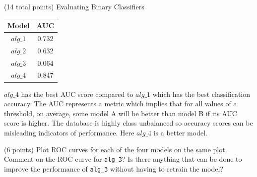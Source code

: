 \documentclass[12pt]{article}
\begin{document}
\begin{question}{(14 total points) Evaluating Binary Classifiers}
\begin{subquestion}
\begin{answerbox}{15em}
\begin{center}
    \begin{tabular}{|c|c|}
    \hline
    Model & AUC \\ \hline
    $alg\_1$ & 0.732 \\
    $alg\_2$ & 0.632 \\
    $alg\_3$ & 0.064 \\
    $alg\_4$ & 0.847 \\
    \hline
    \end{tabular}
\end{center}
$alg\_4$ has the best AUC score compared to $alg\_1$ which has the best classification accuracy. The AUC represents a metric which implies that for all values of a threshold, on average, some model A will be better than model B if its AUC score is higher. The database is highly class unbalanced so accuracy scores can be misleading indicators of performance. Here $alg\_4$ is a better model.
\end{answerbox}



\end{subquestion}



%
%
\begin{subquestion}{(6 points) Plot ROC curves for each of the four models on the same plot.
Comment on the ROC curve for \texttt{alg\_3}?
Is there anything that can be done to improve the performance of \texttt{alg\_3} without having to retrain the model?\\
}



\end{subquestion}
\end{question}
\end{document}
